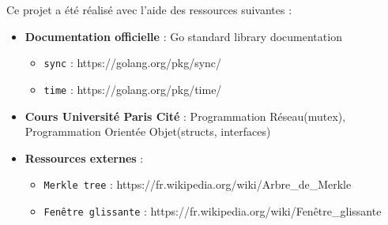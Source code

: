 \documentclass[11pt,a4paper]{report}
\begin{document}
Ce projet a été réalisé avec l'aide des ressources suivantes :

\begin{itemize}
    \item \textbf{Documentation officielle} : Go standard library documentation
    \begin{itemize}
        \item \texttt{sync} : https://golang.org/pkg/sync/
        \item \texttt{time} : https://golang.org/pkg/time/
    \end{itemize}
    \item \textbf{Cours Université Paris Cité} : Programmation Réseau(mutex), Programmation Orientée Objet(structs, interfaces)
    \item \textbf{Ressources externes} : 
    \begin{itemize}
        \item \texttt{Merkle tree} : https://fr.wikipedia.org/wiki/Arbre\_de\_Merkle
        \item \texttt{Fenêtre glissante} : https://fr.wikipedia.org/wiki/Fenêtre\_glissante
    \end{itemize}
\end{itemize}
\end{document}
